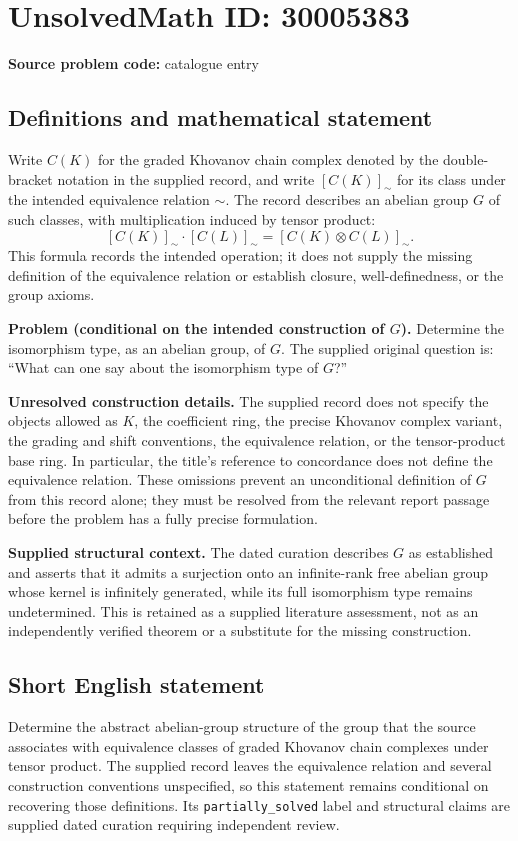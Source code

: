 \documentclass[11pt]{article}
\begin{document}
\section*{UnsolvedMath ID: 30005383}
\textbf{Source problem code:} catalogue entry
\subsection{Definitions and mathematical statement}
Write \(C(K)\) for the graded Khovanov chain complex denoted by the double-bracket notation in the supplied record, and write \([C(K)]_{\sim}\) for its class under the intended equivalence relation \(\sim\). The record describes an abelian group \(G\) of such classes, with multiplication induced by tensor product:
\[
[C(K)]_{\sim}\cdot[C(L)]_{\sim}
=[C(K)\otimes C(L)]_{\sim}.
\]
This formula records the intended operation; it does not supply the missing definition of the equivalence relation or establish closure, well-definedness, or the group axioms.

\textbf{Problem (conditional on the intended construction of \(G\)).} Determine the isomorphism type, as an abelian group, of \(G\). The supplied original question is: ``What can one say about the isomorphism type of \(G\)?''

\textbf{Unresolved construction details.} The supplied record does not specify the objects allowed as \(K\), the coefficient ring, the precise Khovanov complex variant, the grading and shift conventions, the equivalence relation, or the tensor-product base ring. In particular, the title's reference to concordance does not define the equivalence relation. These omissions prevent an unconditional definition of \(G\) from this record alone; they must be resolved from the relevant report passage before the problem has a fully precise formulation.

\textbf{Supplied structural context.} The dated curation describes \(G\) as established and asserts that it admits a surjection onto an infinite-rank free abelian group whose kernel is infinitely generated, while its full isomorphism type remains undetermined. This is retained as a supplied literature assessment, not as an independently verified theorem or a substitute for the missing construction.
\subsection{Short English statement}
Determine the abstract abelian-group structure of the group that the source associates with equivalence classes of graded Khovanov chain complexes under tensor product. The supplied record leaves the equivalence relation and several construction conventions unspecified, so this statement remains conditional on recovering those definitions. Its \texttt{partially\_solved} label and structural claims are supplied dated curation requiring independent review.
\end{document}

